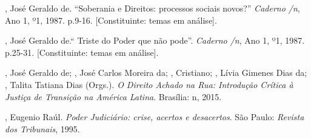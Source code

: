 \begin{Parskip}
 , José Geraldo de.
``Soberania e Direitos: processos sociais
novos?'' \emph{Caderno /n}, Ano 1, º1,
1987. p.9-16. {[}Constituinte: temas em análise{]}.

 , José Geraldo de.`` Triste do Poder que não pode''.
\emph{Caderno /n}, Ano 1, º1, 1987. p.25-31. {[}Constituinte:
temas em análise{]}.

 , José Geraldo de;  , José Carlos Moreira da;
, Cristiano; , Lívia Gimenes Dias da; , Talita
Tatiana Dias (Orgs.). \emph{O Direito Achado na Rua: Introdução
Crítica à Justiça de Transição na América Latina}. Brasília: n, 2015.

, Eugenio Raúl. \emph{Poder Judiciário: crise, acertos e
desacertos}. São Paulo: \emph{Revista dos Tribunais}, 1995.
\end{Parskip}